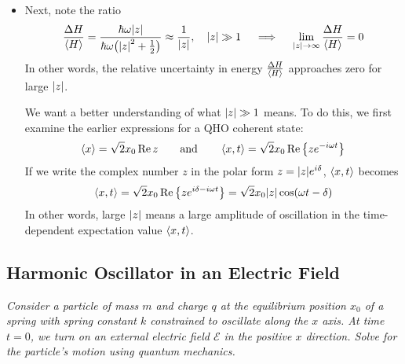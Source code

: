 \documentclass[11pt, a4paper]{article}
\newcommand{\eqtext}[1]{\qquad \text{#1} \qquad}
\begin{document}
\begin{itemize}
	\item Next, note the ratio
	\begin{equation*}
		\frac{\Delta H}{\ev{H}} = \frac{\hbar \omega \abs{z}}{\hbar \omega \big(\abs{z}^{2} + \tfrac{1}{2}\big)} \approx \frac{1}{\abs{z}}, \quad \abs{z} \gg 1 \quad \implies \quad \lim_{\abs{z} \to \infty} \frac{\Delta H}{\ev{H}} = 0
	\end{equation*}
	In other words, the relative uncertainty in energy $ \frac{\Delta H}{\ev{H}} $ approaches zero for large $ \abs{z} $. 
	
	We want a better understanding of what  $ \abs{z} \gg 1 $ means. To do this, we first examine the earlier expressions for a QHO coherent state:
	\begin{equation*}
		\ev{x} = \sqrt{2}x_{0}\Re z \eqtext{and} \ev{x, t} = \sqrt{2}x_{0}\Re \left\{ze^{-i\omega t}\right\}
	\end{equation*}
	If we write the complex number $ z $ in the polar form $ z = \abs{z}e^{i\delta} $, $ \ev{x, t}  $ becomes
	\begin{equation*}
		\ev{x, t}  =  \sqrt{2}x_{0}\Re \left\{ze^{i\delta -i\omega t}\right\} = \sqrt{2}x_{0}\abs{z}\cos(\omega t - \delta  )
	\end{equation*}
	In other words, large $ \abs{z} $ means a large amplitude of oscillation in the time-dependent expectation value $ \ev{x, t} $. 
	
\end{itemize}

\subsection{Harmonic Oscillator in an Electric Field}
\textit{Consider a particle of mass $ m $ and charge $ q $ at the equilibrium position $ x_{0} $ of a spring with spring constant $ k $ constrained to oscillate along the $ x $ axis. At time $ t = 0 $, we turn on an external electric field $ \mathcal{E} $ in the positive $ x $ direction. Solve for the particle's motion using quantum mechanics. }
\end{document}
